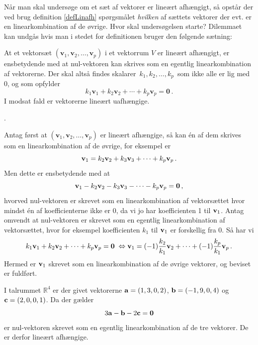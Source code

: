 Når man skal undersøge om et sæt af vektorer er lineært afhængigt, så opstår der ved brug definition \ref{defLinafh} spørgsmålet \textit{hvilken} af sættets vektorer der evt. er en linearkombination af de øvrige. Hvor  skal undersøgelsen starte? Dilemmaet kan undgås hvis man i stedet for definitionen bruger den følgende sætning:
 
\begin{theorem}\label{tn7.linafh}
At et vektorsæt  $(\mathbf v_1,\mathbf v_2,\ldots,\mathbf v_p)$ i et vektorrum $V$ er lineært afhængigt, er ensbetydende med at nul-vektoren kan skrives som en egentlig li\-nearkombination af vektorerne. Der skal altså findes skalarer $\,k_1, k_2,\ldots, k_p\,$ som ikke alle er lig med 0, og som opfylder
\begin{equation}
k_1{\mathbf v}_1+k_2{\mathbf v}_2+\cdots+k_p{\mathbf v}_p= \mathbf 0\,.
\end{equation}
I modsat fald er vektorerne lineært uafhængige.
\end{theorem}.

\begin{bevis}
Antag først at $(\mathbf v_1,\mathbf v_2,\ldots,\mathbf v_p)$ er lineært afhængige, så kan én af dem skrives som en linearkombination af de øvrige, for eksempel er
\begin{equation}
\mathbf{v}_1=k_2\mathbf{v}_2+k_3\mathbf{v}_3+\cdots+k_{p}\mathbf{v}_{p}\,.
\end{equation}
Men dette er ensbetydende med at
\begin{equation}
\mathbf{v}_1-k_2\mathbf{v}_2-k_3\mathbf{v}_3-\cdots-k_{p}\mathbf{v}_{p}=\mathbf 0\,,
\end{equation}
hvorved nul-vektoren er skrevet som en linearkombination af vektorsættet hvor mindst én af koefficienterne ikke er $0$, da vi jo har koefficienten 1 til $\mathbf{v}_1$.\bs
Antag omvendt at nul-vektoren er skrevet som en egentlig linearkombination af vektorsættet, hvor for eksempel koefficienten $k_1$ til $\mathbf{v}_1$ er forskellig fra $0$. Så har vi
\begin{equation}
k_1\mathbf{v}_1+k_2\mathbf{v}_2+\cdots+k_{p}\mathbf{v}_{p}=\mathbf 0\; \Leftrightarrow
\mathbf{v}_1=(-1)\frac{k_2}{k_1}\mathbf{v}_2+\cdots+(-1)\frac{k_p}{k_1}\mathbf{v}_p\,.
\end{equation}
Hermed er $\mathbf{v}_1$ skrevet som en linearkombination af de øvrige vektorer, og beviset er fuldført.
\end{bevis}

\begin{example}
I talrummet $\mathbb R^4$ er der givet vektorerne $\mathbf{a}=(1,3,0,2)$, $\mathbf{b}=(-1,9,0,4)$ og $\mathbf{c}=(2,0,0,1)$. Da der gælder
$$
3\mathbf{a}-\mathbf{b}-2\mathbf{c}=\mathbf 0
$$
er nul-vektoren skrevet som en egentlig linearkombination af de tre vektorer. De er derfor lineært afhængige.
\end{example}

